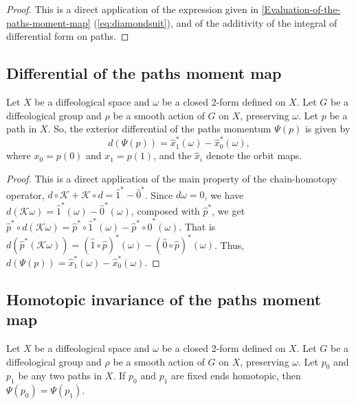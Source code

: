 \documentclass[10pt,reqno,twoside]{amsart}
\newcommand{\cK}{\mathcal{K}}
\newcommand{\but}{\hat{1}}
\newcommand{\source}{\hat{0}}
\theoremstyle{plain}
\theoremstyle{definition}
\newcommand{\article}[1]{\subsection{#1}}
\begin{document}
  \begin{proof}
    This is a direct application of the expression given in \ref{Evaluation-of-the-paths-moment-map} (\ref{eq:diamondsuit}),
    and of the additivity of the integral of differential form on paths.
  \end{proof}
  
  \article{Differential of the paths moment map}
  \label{Differential-of-a-paths-momentum}
  Let $X$ be a diffeological space and $\omega$ be a closed 2-form defined on $X$.
  Let $G$ be a diffeological group and $\rho$ be a smooth action of $G$ on $X$,
  preserving $\omega$.
  Let $p$ be a path in $X$.
  So,
  the exterior differential of the paths momentum $\Psi(p)$ is given by
  $$
    d(\Psi(p)) = \hat x_1^*(\omega) - \hat x_0^*(\omega),
    $$
  where $x_0=p(0)$ and $x_1 = p(1)$,
  and the $\hat x_i$ denote the orbit maps.
  
  \begin{proof}
    This is a direct application of the main property of the chain-homotopy operator,
    $d \circ \cK + \cK \circ d = \but^* - \source^*$.
    Since $d\omega = 0$,
    we have $d(\cK \omega) = \but^*(\omega) - \source^*(\omega)$,
    composed with $\hat p^*$,
    we get $\hat p^* \circ d(\cK \omega) = \hat p^* \circ \but^*(\omega) - \hat p^* \circ \source^*(\omega)$.
    That is $d(\hat p^*(\cK \omega)) = (\but \circ \hat p)^*(\omega) - (\source \circ \hat p)^*(\omega)$.
    Thus,
    $d(\Psi(p)) = \hat x_1^*(\omega) - \hat x_0^*(\omega)$.
  \end{proof}
  
  \article{Homotopic invariance of the paths moment map}
  \label{Homotopic-invariance-of-the-paths-moment-map}
  Let $X$ be a diffeological space and $\omega$ be a closed 2-form defined on $X$.
  Let $G$ be a diffeological group and $\rho$ be a smooth action of $G$ on $X$,
  preserving $\omega$.
  Let $p_0$ and $p_1$ be any two paths in $X$.
  If $p_0$ and $p_1$ are fixed ends homotopic,
  then $\Psi(p_0) = \Psi(p_1)$.
  
\end{document}
